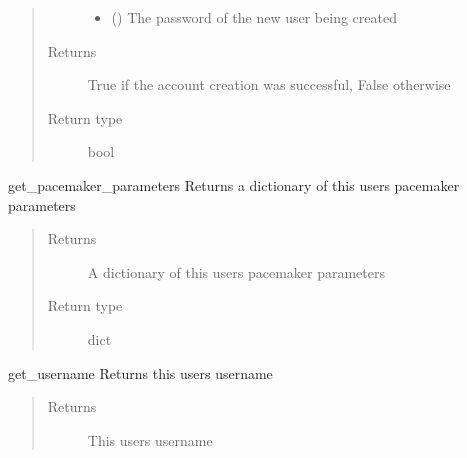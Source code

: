 \documentclass[letterpaper,10pt,english]{sphinxmanual}
\begin{document}
\begin{fulllineitems}
\begin{fulllineitems}
\begin{quote}
\begin{description}
\begin{itemize}
\item {} 
 () \textendash{} The password of the new user being created

\end{itemize}

\item[{Returns}] \leavevmode
True if the account creation was successful, False otherwise

\item[{Return type}] \leavevmode
bool

\end{description}\end{quote}

\end{fulllineitems}


\begin{fulllineitems}
\label{\detokenize{flaskapp.data:flaskapp.data.user.User.get_pacemaker_parameters}}
get\_pacemaker\_parameters Returns a dictionary of this users pacemaker parameters
\begin{quote}\begin{description}
\item[{Returns}] \leavevmode
A dictionary of this users pacemaker parameters

\item[{Return type}] \leavevmode
dict

\end{description}\end{quote}

\end{fulllineitems}


\begin{fulllineitems}
\label{\detokenize{flaskapp.data:flaskapp.data.user.User.get_username}}
get\_username Returns this users username
\begin{quote}\begin{description}
\item[{Returns}] \leavevmode
This users username


\end{description}
\end{quote}
\end{fulllineitems}
\end{fulllineitems}
\end{document}
